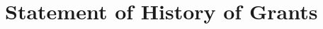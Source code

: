 \documentclass{article}[11pt]
\begin{document}





\section{Statement of History of Grants}




\clearpage
\end{document}
